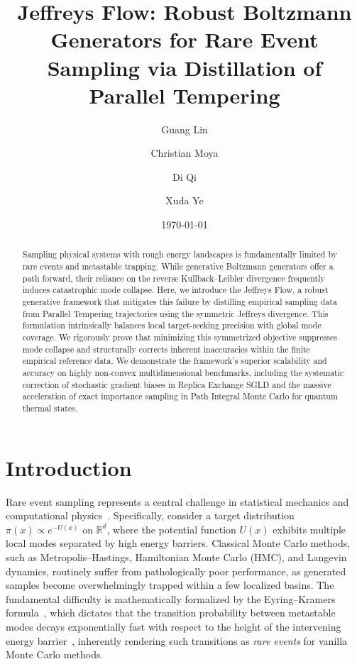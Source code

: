\documentclass[%
 reprint,
 amsmath,amssymb,
 aps,
 pre,
]{revtex4-2}
\begin{document}
\title{Jeffreys Flow: Robust Boltzmann Generators for Rare Event Sampling via Distillation of Parallel Tempering}

\author{Guang Lin}
\author{Christian Moya}
\author{Di Qi}
\author{Xuda Ye}

\date{\today}

\begin{abstract}
Sampling physical systems with rough energy landscapes is fundamentally limited by rare events and metastable trapping. While generative Boltzmann generators offer a path forward, their reliance on the reverse Kullback--Leibler divergence frequently induces catastrophic mode collapse. Here, we introduce the Jeffreys Flow, a robust generative framework that mitigates this failure by distilling empirical sampling data from Parallel Tempering trajectories using the symmetric Jeffreys divergence. This formulation intrinsically balances local target-seeking precision with global mode coverage. We rigorously prove that minimizing this symmetrized objective suppresses mode collapse and structurally corrects inherent inaccuracies within the finite empirical reference data. We demonstrate the framework's superior scalability and accuracy on highly non-convex multidimensional benchmarks, including the systematic correction of stochastic gradient biases in Replica Exchange SGLD and the massive acceleration of exact importance sampling in Path Integral Monte Carlo for quantum thermal states.
\end{abstract}

\maketitle

\section{Introduction}
\label{section: introduction}

Rare event sampling represents a central challenge in statistical mechanics and computational physics~\cite{bucklew2004introduction, rubino2009rare, rubino2009introduction}. Specifically, consider a target distribution $\pi(x) \propto e^{-U(x)}$ on $\mathbb{R}^d$, where the potential function $U(x)$ exhibits multiple local modes separated by high energy barriers. Classical Monte Carlo methods, such as Metropolis--Hastings, Hamiltonian Monte Carlo (HMC), and Langevin dynamics, routinely suffer from pathologically poor performance, as generated samples become overwhelmingly trapped within a few localized basins. The fundamental difficulty is mathematically formalized by the Eyring--Kramers formula~\cite{eyring1935activated, kramers1940brownian}, which dictates that the transition probability between metastable modes decays exponentially fast with respect to the height of the intervening energy barrier~\cite{bouchet2016generalisation, lee2022non}, inherently rendering such transitions as \emph{rare events} for vanilla Monte Carlo methods.
\end{document}
